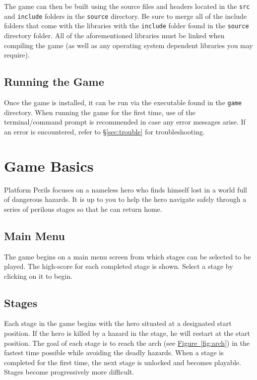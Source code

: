 \documentclass[12pt, titlepage]{article}
\begin{document}
\noindent The game can then be built using the source files and headers located in the \texttt{src} and \texttt{include} folders in the \texttt{source} directory.  Be sure to merge all of the include folders that come with the libraries with the \texttt{include} folder found in the \texttt{source} directory folder.  All of the aforementioned libraries must be linked when compiling the game (as well as any operating system dependent libraries you may require).

\subsection{Running the Game}
Once the game is installed, it can be run via the executable found in the \texttt{game} directory.  When running the game for the first time, use of the terminal/command prompt is recommended in case any error messages arise.  If an error is encountered, refer to \hyperref[sec:trouble]{\S\ref*{sec:trouble}} for troubleshooting.


\section{Game Basics}
\label{sec:basics}
Platform Perils focuses on a nameless hero who finds himself lost in a world full of dangerous hazards.  It is up to you to help the hero navigate safely through a series of perilous stages so that he can return home.

\subsection{Main Menu}
The game begins on a main menu screen from which stages can be selected to be played.  The high-score for each completed stage is shown.  Select a stage by clicking on it to begin.

\subsection{Stages}
\noindent Each stage in the game begins with the hero situated at a designated start position.  If the hero is killed by a hazard in the stage, he will restart at the start position.  The goal of each stage is to reach the arch (see \hyperref[fig:arch]{Figure~\ref*{fig:arch}}) in the fastest time possible while avoiding the deadly hazards. When a stage is completed for the first time, the next stage is unlocked and becomes playable.  Stages become progressively more difficult.
\end{document}
